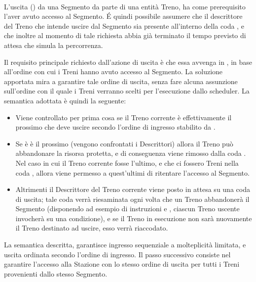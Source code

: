 \begin{description}
			\item {} \\ 
			
			L'uscita () da una Segmento da parte di una entità Treno, ha come prerequisito l'aver avuto accesso al Segmento. \'E quindi possibile assumere che il descrittore del Treno che intende uscire dal Segmento sia presente all'interno della coda , e che inoltre al momento di tale richiesta abbia già terminato il tempo previsto di attesa che simula la percorrenza.
			
			Il requisito principale richiesto dall'azione di uscita è che essa avvenga in , in base all'ordine con cui i Treni hanno avuto accesso al Segmento. La soluzione apportata mira a garantire tale ordine di uscita, senza fare alcuna assunzione sull'ordine con il quale i Treni verranno scelti per l'esecuzione dallo scheduler. La semantica adottata è quindi la seguente:
			\begin{itemize}
				 \item Viene controllato per prima cosa se il Treno corrente è effettivamente il prossimo che deve uscire secondo l'ordine di ingresso stabilito da .
				 \item Se è è il prossimo (vengono confrontati i Descrittori) allora il Treno può abbandonare la risorsa protetta, e di conseguenza viene rimosso dalla coda . Nel caso in cui il Treno corrente fosse l'ultimo, e che ci fossero Treni nella coda , allora viene permesso a quest'ultimi di ritentare l'accesso al Segmento.
				 \item Altrimenti il Descrittore del Treno corrente viene posto in attesa su una coda di uscita; tale coda verrà riesaminata ogni volta che un Treno abbandonerà il Segmento (disponendo ad esempio di instruzioni  e , ciascun Treno uscente invocherà  su una condizione), e se il Treno in esecuzione non sarà nuovamente il Treno destinato ad uscire, esso verrà riaccodato. 
			\end{itemize}
		\end {description}
	
	La semantica descritta, garantisce ingresso sequenziale a molteplicità limitata, e uscita ordinata secondo l'ordine di ingresso. Il passo successivo consiste nel garantire l'accesso alla Stazione con lo stesso ordine di uscita per tutti i Treni provenienti dallo stesso Segmento.


